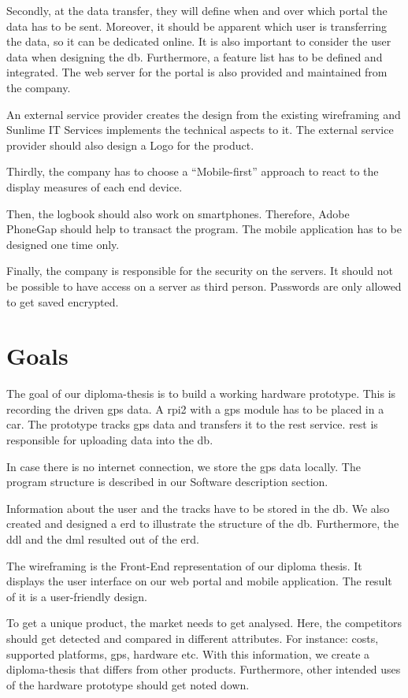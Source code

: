 Secondly, at the data transfer, they will define when and over which portal the data has to be sent. Moreover, it should be apparent which user is transferring the data, so it can be dedicated online. It is also important to consider the user data when designing the \gls{db}. Furthermore, a feature list has to be defined and integrated.
The web server for the portal is also provided and maintained from the company.

An external service provider creates the design from the existing wireframing and Sunlime IT Services implements the technical aspects to it. The external service provider should also design a Logo for the product.

Thirdly, the company has to choose a “Mobile-first” approach to react to the display measures of each end device.

Then, the logbook should also work on smartphones. Therefore, Adobe PhoneGap should help to transact the program. The mobile application has to be designed one time only.

Finally, the company is responsible for the security on the servers. It should not be possible to have access on a server as third person. Passwords are only allowed to get saved encrypted.
\newpage
\section*{Goals}
The goal of our diploma-thesis is to build a working hardware prototype. This is recording the driven \gls{gps} data. A \gls{rpi2} with a \gls{gps} module has to be placed in a car. The prototype tracks \gls{gps} data and transfers it to the \gls{rest} service. \gls{rest} is responsible for uploading data into the \gls{db}. 

In case there is no internet connection, we store the \gls{gps} data locally. The program structure is described in our Software description section.

Information about the user and the tracks have to be stored in the \gls{db}. We also created and designed a \gls{erd} to illustrate the structure of the \gls{db}. Furthermore, the \gls{ddl} and the \gls{dml} resulted out of the \gls{erd}.

The wireframing is the Front-End representation of our diploma thesis. It displays the user interface on our web portal and mobile application. The result of it is a user-friendly design.

To get a unique product, the market needs to get analysed. Here, the competitors should get detected and compared in different attributes. For instance: costs, supported platforms, \gls{gps}, hardware etc. With this information, we create a diploma-thesis that differs from other products. Furthermore, other intended uses of the hardware prototype should get noted down.

